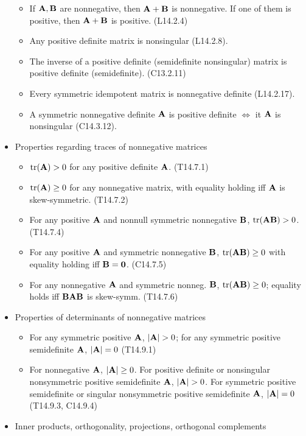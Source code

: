 \documentclass[a4paper, oneside]{book}
\begin{document}
\begin{itemize}
\begin{itemize}
	\item If $\mathbf{A},\mathbf{B}$ are nonnegative, then $\mathbf{A+B}$ is nonnegative. If one of them is positive, then $\mathbf{A+B}$ is positive. (L14.2.4)
	\item Any positive definite matrix is nonsingular (L14.2.8).
	\item The inverse of a positive definite (semidefinite nonsingular) matrix is positive definite (semidefinite). (C13.2.11)
	\item Every symmetric idempotent matrix is nonnegative definite (L14.2.17).
	\item A symmetric nonnegative definite $\mathbf{A}$ is positive definite $\iff$ it $\mathbf{A}$ is nonsingular (C14.3.12).
\end{itemize}
\item Properties regarding traces of nonnegative matrices
\begin{itemize}
	\item $\text{tr}(\mathbf{A})>0$ for any positive definite $\mathbf{A}$. (T14.7.1)
	\item $\text{tr}(\mathbf{A})\ge 0$ for any nonnegative matrix, with equality holding iff $\mathbf{A}$ is skew-symmetric. (T14.7.2)
	\item For any positive $\mathbf{A}$ and nonnull symmetric nonnegative $\mathbf{B}$, $\text{tr}(\mathbf{AB})>0$. (T14.7.4)
	\item For any positive $\mathbf{A}$ and symmetric nonnegative $\mathbf{B}$, $\text{tr}(\mathbf{AB})\ge 0$ with equality holding iff $\mathbf{B}=\mathbf{0}$. (C14.7.5)
	\item For any nonnegative $\mathbf{A}$ and symmetric nonneg. $\mathbf{B}$, $\text{tr}(\mathbf{AB})\ge 0$; equality holds iff $\mathbf{BAB}$ is skew-symm. (T14.7.6)
	\end{itemize}
\item Properties of determinants of nonnegative matrices
\begin{itemize} 
\item For any symmetric positive $\mathbf{A}$, $|\mb{A}|>0$; for any symmetric positive semidefinite $\mathbf{A}$, $|\mathbf{A}|=0$ (T14.9.1)
\item For nonnegative $\mathbf{A}$, $|\mathbf{A}|\ge 0$. For positive definite or nonsingular nonsymmetric positive semidefinite $\mathbf A$, $|\mb{A}|>0$. For symmetric positive semidefinite or singular nonsymmetric positive semidefinite $\mathbf A$, $|\mathbf{A}|=0$ (T14.9.3, C14.9.4)
\end{itemize}
\item Inner products, orthogonality, projections, orthogonal complements
	\begin{itemize}

\end{itemize}
\end{itemize}
\end{document}
